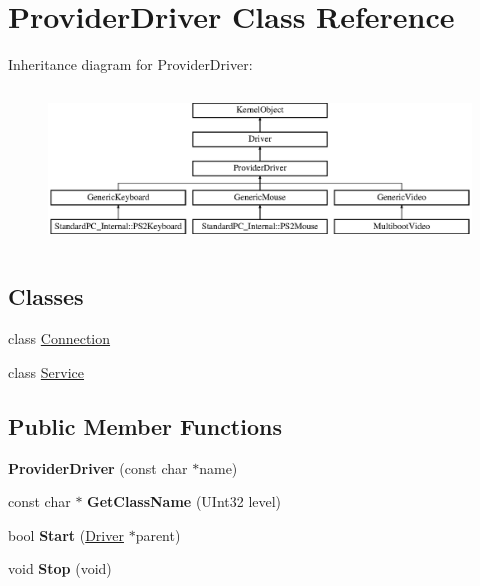 \hypertarget{class_provider_driver}{}\section{Provider\+Driver Class Reference}
\label{class_provider_driver}
Inheritance diagram for Provider\+Driver\+:\begin{figure}[H]
\begin{center}
\leavevmode
\includegraphics[height=4.223228cm]{class_provider_driver}
\end{center}
\end{figure}
\subsection*{Classes}
\begin{DoxyCompactItemize}
\item 
class \hyperlink{class_provider_driver_1_1_connection}{Connection}
\item 
class \hyperlink{class_provider_driver_1_1_service}{Service}
\end{DoxyCompactItemize}
\subsection*{Public Member Functions}
\begin{DoxyCompactItemize}
\item 
\mbox{\label{class_provider_driver_a70e0a4119c8894ad7a0023979eaf3d56}} 
{\bfseries Provider\+Driver} (const char $\ast$name)
\item 
\mbox{\label{class_provider_driver_a05f05c310c5b901a1546136953ab098d}} 
const char $\ast$ {\bfseries Get\+Class\+Name} (U\+Int32 level)
\item 
\mbox{\label{class_provider_driver_a7102ff8ba4f54e3448656a069f31990c}} 
bool {\bfseries Start} (\hyperlink{class_driver}{Driver} $\ast$parent)
\item 
\mbox{\label{class_provider_driver_a4da2459f85a8e1f5c6b5020b70ab3309}} 
void {\bfseries Stop} (void)
\end{DoxyCompactItemize}
